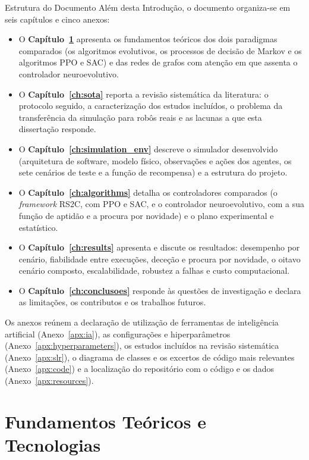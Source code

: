 \documentclass[12pt,reqno, twoside]{amsbook}
\makeatletter
\def\section{\@startsection{section}{1}%
      \z@{.5\linespacing\@plus.7\linespacing}{.25\linespacing}%
      {\normalfont\bfseries\flushleft}}
\theoremstyle{plain}
\numberwithin{equation}{chapter}
\numberwithin{section}{chapter}
\numberwithin{table}{chapter}
\numberwithin{figure}{chapter}
\makeatother
\begin{document}
\section{Estrutura do Documento}
\label{sec:estrutura_documento}
Além desta Introdução, o documento organiza-se em seis capítulos e cinco anexos:
\begin{itemize}
    \item O \textbf{Capítulo~\ref{ch:fundamentos}} apresenta os fundamentos teóricos dos dois paradigmas comparados (os algoritmos evolutivos, os processos de decisão de Markov e os algoritmos PPO e SAC) e das redes de grafos com atenção em que assenta o controlador neuroevolutivo.
    \item O \textbf{Capítulo~\ref{ch:sota}} reporta a revisão sistemática da literatura: o protocolo seguido, a caracterização dos estudos incluídos, o problema da transferência da simulação para robôs reais e as lacunas a que esta dissertação responde.
    \item O \textbf{Capítulo~\ref{ch:simulation_env}} descreve o simulador desenvolvido (arquitetura de software, modelo físico, observações e ações dos agentes, os sete cenários de teste e a função de recompensa) e a estrutura do projeto.
    \item O \textbf{Capítulo~\ref{ch:algorithms}} detalha os controladores comparados (o \textit{framework} RS2C, com PPO e SAC, e o controlador neuroevolutivo, com a sua função de aptidão e a procura por novidade) e o plano experimental e estatístico.
    \item O \textbf{Capítulo~\ref{ch:results}} apresenta e discute os resultados: desempenho por cenário, fiabilidade entre execuções, deceção e procura por novidade, o oitavo cenário composto, escalabilidade, robustez a falhas e custo computacional.
    \item O \textbf{Capítulo~\ref{ch:conclusoes}} responde às questões de investigação e declara as limitações, os contributos e os trabalhos futuros.
\end{itemize}
Os anexos reúnem a declaração de utilização de ferramentas de inteligência artificial (Anexo~\ref{apx:ia}), as configurações e hiperparâmetros (Anexo~\ref{apx:hyperparameters}), os estudos incluídos na revisão sistemática (Anexo~\ref{apx:slr}), o diagrama de classes e os excertos de código mais relevantes (Anexo~\ref{apx:code}) e a localização do repositório com o código e os dados (Anexo~\ref{apx:resources}).

\chapter{Fundamentos Teóricos e Tecnologias}
\label{ch:fundamentos}
\end{document}
